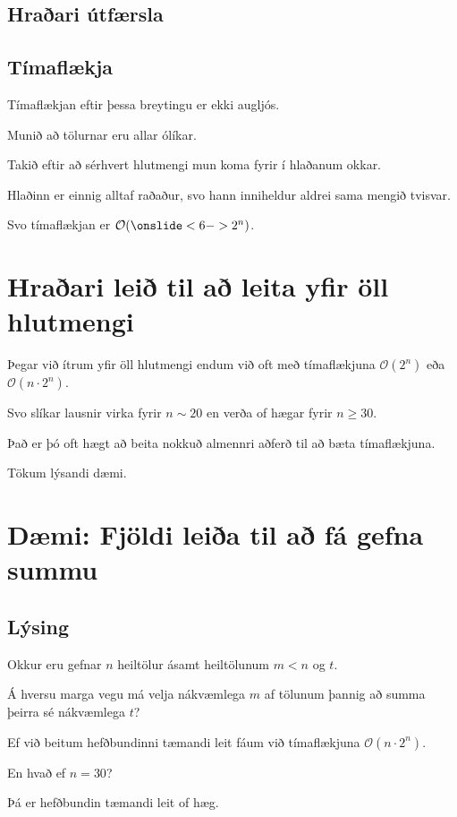 \subsection{Hraðari útfærsla}
{
}

\subsection{Tímaflækja}
{
    {
        \item<1-> Tímaflækjan eftir þessa breytingu er ekki augljós.
        \item<2-> Munið að tölurnar eru allar ólíkar.
        \item<3-> Takið eftir að sérhvert hlutmengi mun koma fyrir í hlaðanum okkar.
        \item<4-> Hlaðinn er einnig alltaf raðaður, svo hann inniheldur aldrei sama mengið tvisvar.
        \item<5-> Svo tímaflækjan er $\mathcal{O}(\onslide<6->{2^n})$.
    }
}

\section{Hraðari leið til að leita yfir öll hlutmengi}
{
    {
        \item<1-> Þegar við ítrum yfir öll hlutmengi endum við oft með tímaflækjuna $\mathcal{O}(2^n)$ eða $\mathcal{O}(n \cdot 2^n)$.
        \item<2-> Svo slíkar lausnir virka fyrir $n \sim 20$ en verða of hægar fyrir $n \geq 30$.
        \item<3-> Það er þó oft hægt að beita nokkuð almennri aðferð til að bæta tímaflækjuna.
        \item<4-> Tökum lýsandi dæmi.
    }
}

\section{Dæmi: Fjöldi leiða til að fá gefna summu}
\subsection{Lýsing}
{
    {
        \item<1-> Okkur eru gefnar $n$ heiltölur ásamt heiltölunum $m < n$ og $t$.
        \item<2-> Á hversu marga vegu má velja nákvæmlega $m$ af tölunum þannig að summa þeirra sé nákvæmlega $t$?
        \item<3-> Ef við beitum hefðbundinni tæmandi leit fáum við tímaflækjuna $\mathcal{O}(n \cdot 2^n)$.
        \item<4-> En hvað ef $n = 30$?
        \item<5-> Þá er hefðbundin tæmandi leit of hæg.
    }
}

